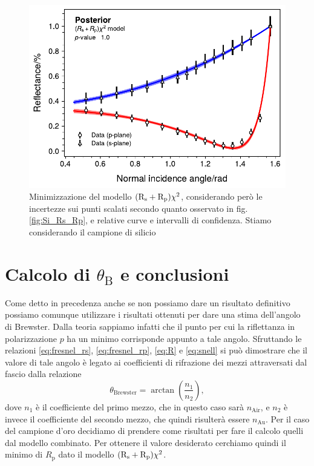 \documentclass[
    prb,altaffilletter,citeautoscript,
    amsmath,amssymb,
    showpacs,showkeys,floatfix,
    reprint
]{revtex4-1}
\begin{document}
\begin{figure}
    \centering
    \includegraphics[width=\linewidth]{figures/Si_rescaled_fit.pdf}
    \caption{Minimizzazione del modello $\qty(\mathrm{R_s}+ \mathrm{R_p})\chi^2$, considerando però le incertezze sui punti scalati secondo quanto osservato in fig. \ref{fig:Si_Rs_Rp}, e relative curve e intervalli di confidenza. Stiamo considerando il campione di silicio}
    \label{fig:Si_rescaled_fit}
\end{figure}

\section{Calcolo di $\theta_\mathrm{B}$ e conclusioni}\label{sec:Brewster}
Come detto in precedenza anche se non possiamo dare un risultato definitivo possiamo comunque utilizzare i risultati ottenuti per dare una stima dell'angolo di Brewster. Dalla teoria sappiamo infatti che il punto per cui la riflettanza in polarizzazione $p$ ha un minimo corrisponde appunto a tale angolo. Sfruttando le relazioni \eqref{eq:fresnel_rs}, \eqref{eq:fresnel_rp}, \eqref{eq:R} e \eqref{eq:snell} si può dimostrare che il valore di tale angolo è legato ai coefficienti di rifrazione dei mezzi attraversati dal fascio dalla relazione \begin{equation}\label{eq:Brewster}
    \theta_{\text{Brewster}} = \arctan(\frac{n_1}{n_2}),
\end{equation} dove $n_1$ è il coefficiente del primo mezzo, che in questo caso sarà $n_\mathrm{Air}$, e $n_2$ è invece il coefficiente del secondo mezzo, che quindi risulterà essere $n_\mathrm{Au}$. Per il caso del campione d'oro decidiamo di prendere come risultati per fare il calcolo quelli dal modello combinato. Per ottenere il valore desiderato cerchiamo quindi il minimo di $R_\mathrm{p}$ dato il modello $\qty(\mathrm{R_s}+ \mathrm{R_p})\chi^2$. 
\end{document}
